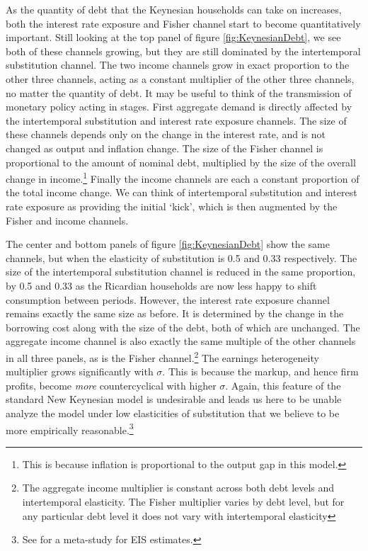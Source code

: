 \documentclass[12pt,a4paper]{article}
\begin{document}
As the quantity of debt that the Keynesian households can take on increases, both the interest rate exposure and Fisher channel start to become quantitatively important. Still looking at the top panel of figure \ref{fig:KeynesianDebt}, we see both of these channels growing, but they are still dominated by the intertemporal substitution channel. The two income channels grow in exact proportion to the other three channels, acting as a constant multiplier of the other three channels, no matter the quantity of debt. It may be useful to think of the transmission of monetary policy acting in stages. First aggregate demand is directly affected by the intertemporal substitution and interest rate exposure channels. The size of these channels depends only on the change in the interest rate, and is not changed as output and inflation change. The size of the Fisher channel is proportional to the amount of nominal debt, multiplied by the size of the overall change in income.\footnote{This is because inflation is proportional to the output gap in this model.} Finally the income channels are each a constant proportion of the total income change. We can think of intertemporal substitution and interest rate exposure as providing the initial `kick', which is then augmented by the Fisher and income channels.

The center and bottom panels of figure \ref{fig:KeynesianDebt} show the same channels, but when the elasticity of substitution is 0.5 and 0.33 respectively. The size of the intertemporal substitution channel is reduced in the same proportion, by 0.5 and 0.33 as the Ricardian households are now less happy to shift consumption between periods. However, the interest rate exposure channel remains exactly the same size as before. It is determined by the change in the borrowing cost along with the size of the debt, both of which are unchanged. The aggregate income channel is also exactly the same multiple of the other channels in all three panels, as is the Fisher channel.\footnote{The aggregate income multiplier is constant across both debt levels and intertemporal elasticity. The Fisher multiplier varies by debt level, but for any particular debt level it does not vary with intertemporal elasticity} The earnings heterogeneity multiplier grows significantly with $\sigma$. This is because the markup, and hence firm profits, become \textit{more} countercyclical with higher $\sigma$. Again, this feature of the standard New Keynesian model is undesirable and leads us here to be unable analyze the model under low elasticities of substitution that we believe to be more empirically reasonable.\footnote{See \cite{havranek_measuring_2015} for a meta-study for EIS estimates.}
\end{document}
